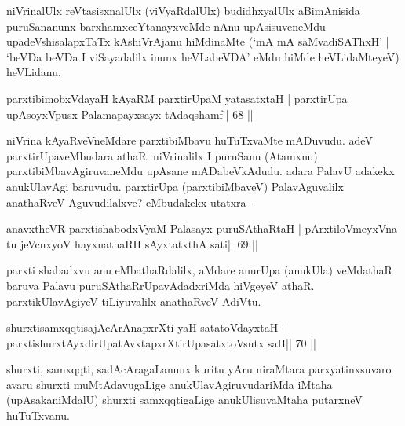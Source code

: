 \begin{artha}
niVrinalUlx reVtasisxnalUlx (viVyaRdalUlx) budidhxyalUlx aBimAnisida  puruSananunx barxhamxceYtanayxveMde nAnu upAsisuveneMdu  upadeVshisalapxTaTx kAshiVrAjanu hiMdinaMte (`mA mA saMvadiSAThxH' | `beVDa beVDa I viSayadalilx inunx heVLabeVDA' eMdu hiMde heVLidaMteyeV) heVLidanu.
\end{artha}


\begin{shl}
parxtibimobxVdayaH kAyaRM parxtirUpaM yatasatxtaH |
parxtirUpa upAsoyxV\s pusx Palamapayxsayx tAdaqshamf\hfill || 68 ||
\end{shl}

\begin{artha}
niVrina kAyaRveVneMdare parxtibiMbavu huTuTxvaMte mADuvudu. adeV parxtirUpaveMbudara athaR. niVrinalilx I puruSanu (Atamxnu) parxtibiMbavAgiruvaneMdu upAsane mADabeVkAdudu. adara PalavU adakekx anukUlavAgi baruvudu. parxtirUpa (parxtibiMbaveV) PalavAguvalilx anathaRveV Aguvudilalxve? eMbudakekx utatxra - 
\end{artha}

\begin{shl}
anavxtheVR parxtishabodxV\s yaM Palasayx puruSAthaRtaH |
pArxtiloVmeyxVna tu jeVcnxyoV hayxnathaRH sAyxtatxthA sati\hfill || 69 ||
\end{shl}

\begin{artha}
parxti shabadxvu anu eMbathaRdalilx, aMdare anurUpa (anukUla) veMdathaR  baruva Palavu puruSAthaRrUpavAdadxriMda hiVgeyeV athaR. parxtikUlavAgiyeV tiLiyuvalilx anathaRveV AdiVtu.
\end{artha}

\begin{shl}
shurxtisamxqqtisajAcArAnapxrXti yaH satatoVdayxtaH |
parxtishurxtAyxdirUpatAvxtapxrXtirUpasatxtoV\s sutx saH\hfill || 70 ||
\end{shl}

\begin{artha}
shurxti, samxqqti, sadAcAragaLanunx kuritu yAru niraMtara parxyatinxsuvaro avaru shurxti muMtAdavugaLige anukUlavAgiruvudariMda iMtaha (upAsakaniMdalU) shurxti samxqqtigaLige anukUlisuvaMtaha putarxneV huTuTxvanu.
\end{artha}


